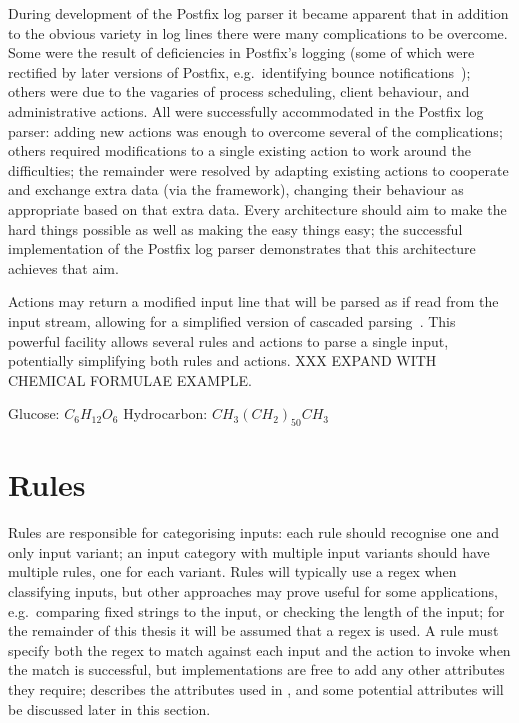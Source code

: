During development of the Postfix log parser it became apparent that in
addition to the obvious variety in log lines there were
many complications to be overcome.  Some were the result of deficiencies in
Postfix's logging (some of which were rectified by later versions of
Postfix, e.g.\ identifying bounce
notifications~); others were
due to the vagaries of process scheduling, client behaviour, and
administrative actions.  All were successfully accommodated in the Postfix
log parser: adding new actions was enough to overcome several of the
complications; others required modifications to a single existing action to
work around the difficulties; the remainder were resolved by adapting
existing actions to cooperate and exchange extra data (via the framework),
changing their behaviour as appropriate based on that extra data.  Every
architecture should aim to make the hard things possible as well as making
the easy things easy; the successful implementation of the Postfix log
parser demonstrates that this architecture achieves that aim.

Actions may return a modified input line that will be parsed as if read
from the input stream, allowing for a simplified version of cascaded
parsing~\cite{cascaded-parsing}.  This powerful facility allows several
rules and actions to parse a single input, potentially simplifying both
rules and actions.  XXX EXPAND WITH CHEMICAL FORMULAE EXAMPLE\@.

Glucose: $C_{6}H_{12}O_{6}$
Hydrocarbon: $CH_{3}{(CH_{2})}_{50}CH_{3}$

\section{Rules}

\label{rules in architecture}

Rules are responsible for categorising inputs: each rule should recognise
one and only input variant; an input category with multiple input variants
should have multiple rules, one for each variant.  Rules will typically use
a regex when classifying inputs, but other approaches may prove useful for
some applications, e.g.\ comparing fixed strings to the input, or checking
the length of the input; for the remainder of this thesis it will be
assumed that a regex is used.  A rule must specify both the regex to match
against each input and the action to invoke when the match is successful,
but implementations are free to add any other attributes they require;
 describes the attributes used in
\parsername{}, and some potential attributes will be discussed later in
this section.

